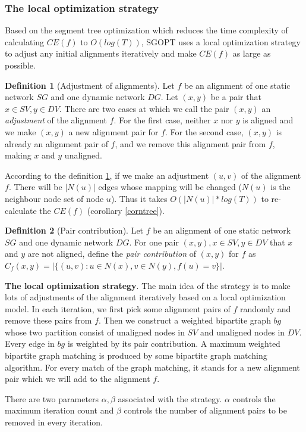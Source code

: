 \documentclass{bioinfo}
\theoremstyle{definition}
\newtheorem{defn}{\textbf{Definition}}[section]%
\begin{document}
\begin{methods}
\subsubsection{The local optimization strategy}
Based on the segment tree optimization which reduces the time complexity of calculating $CE(f)$ to $O(log(T))$, SGOPT uses a local optimization strategy to adjust any initial alignments iteratively and make $CE(f)$ as large as possible.
\begin{defn}[Adjustment of alignments]
\label{defnadj}
Let $f$ be an alignment of one static network $SG$ and one dynamic network $DG$. Let $(x,y)$ be a pair that $x\in SV,y\in DV$. There are two cases at which we call the pair $(x,y)$ an \textit{adjustment} of the alignment $f$. For the first case, neither $x$ nor $y$ is aligned and we make $(x,y)$ a new alignment pair for $f$. For the second case, $(x,y)$ is already an alignment pair of $f$, and we remove this alignment pair from $f$, making $x$ and $y$ unaligned.
\end{defn}
According to the definition \ref{defnadj}, if we make an adjustment $(u,v)$ of the alignment $f$. There will be $|N(u)|$ edges whose mapping will be changed ($N(u)$ is the neighbour node set of node $u$). Thus it takes $O(|N(u)|*log(T))$ to re-calculate the $CE(f)$ (corollary \ref{corntree}).

\begin{defn}[Pair contribution]
\label{defncontribute}
Let $f$ be an alignment of one static network $SG$ and one dynamic network $DG$. For one pair $(x,y),x\in SV,y\in DV$ that $x$ and $y$ are not aligned, define the \textit{pair contribution} of $(x,y)$ for $f$ as $C_f(x,y)=|\{(u,v):u\in N(x),v\in N(y),f(u)=v\}|$.
\end{defn}
\textbf{The local optimization strategy}. The main idea of the strategy is to make lots of adjustments of the alignment iteratively based on a local optimization model. In each iteration, we first pick some alignment pairs of $f$ randomly and remove these pairs from $f$. Then we construct a weighted bipartite graph $bg$ whose two partition consist of unaligned nodes in $SV$ and unaligned nodes in $DV$. Every edge in $bg$ is weighted by its pair contribution. A maximum weighted bipartite graph matching is produced by some bipartite graph matching algorithm. For every match of the graph matching, it stands for a new alignment pair which we will add to the alignment $f$.

There are two parameters $\alpha,\beta$ associated with the strategy. $\alpha$ controls the maximum iteration count and $\beta$ controls the number of alignment pairs to be removed in every iteration.


\end{methods}
\end{document}
